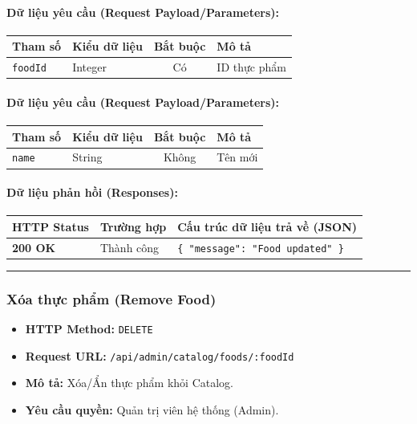 \documentclass[12pt,a4paper]{article}
\begin{document}
\paragraph{Dữ liệu yêu cầu (Request Payload/Parameters):}
\begin{longtable}{|>{\raggedright\arraybackslash}p{2.8cm}|>{\raggedright\arraybackslash}p{2.2cm}|c|>{\raggedright\arraybackslash}p{7.0cm}|}
\hline
\textbf{Tham số} & \textbf{Kiểu dữ liệu} & \textbf{Bắt buộc} & \textbf{Mô tả} \\ \hline
\endhead
\texttt{foodId} & Integer & Có & ID thực phẩm \\ \hline
\end{longtable}

\paragraph{Dữ liệu yêu cầu (Request Payload/Parameters):}
\begin{longtable}{|>{\raggedright\arraybackslash}p{2.8cm}|>{\raggedright\arraybackslash}p{2.2cm}|c|>{\raggedright\arraybackslash}p{7.0cm}|}
\hline
\textbf{Tham số} & \textbf{Kiểu dữ liệu} & \textbf{Bắt buộc} & \textbf{Mô tả} \\ \hline
\endhead
\texttt{name} & String & Không & Tên mới \\ \hline
\end{longtable}

\paragraph{Dữ liệu phản hồi (Responses):}
\begin{longtable}{|>{\raggedright\arraybackslash}p{2.8cm}|>{\raggedright\arraybackslash}p{3.2cm}|>{\raggedright\arraybackslash}p{8.0cm}|}
\hline
\textbf{HTTP Status} & \textbf{Trường hợp} & \textbf{Cấu trúc dữ liệu trả về (JSON)} \\ \hline
\endhead
\textbf{200 OK} & Thành công & \texttt{\{ "message": "Food updated" \}} \\ \hline
\end{longtable}

\vskip 0.4cm
\noindent\rule{\textwidth}{0.3pt}
\vskip 0.4cm

\subsubsection{Xóa thực phẩm (Remove Food)}
\begin{itemize}[leftmargin=*]
    \item \textbf{HTTP Method:} \texttt{DELETE}
    \item \textbf{Request URL:} \texttt{/api/admin/catalog/foods/:foodId}
    \item \textbf{Mô tả:} Xóa/Ẩn thực phẩm khỏi Catalog.
    \item \textbf{Yêu cầu quyền:} Quản trị viên hệ thống (Admin).
\end{itemize}
\end{document}
